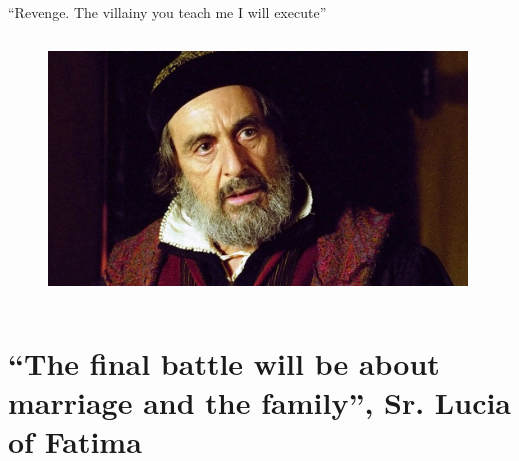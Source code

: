 \documentclass[xcolor=dvipsnames]{beamer}
\begin{document}
\begin{frame}[fragile]{“Revenge. The villainy you teach me I will execute”}
  \begin{columns}[T] %
    \begin{column}{0.9\textwidth}
      \begin{figure}[H]
        \centering
        \includegraphics[width=0.99\textwidth]{shylock}
      \end{figure}
    \end{column}%
  \end{columns}
\end{frame}


\section{``The final battle will be about marriage and the family'', Sr. Lucia of Fatima}
\end{document}
